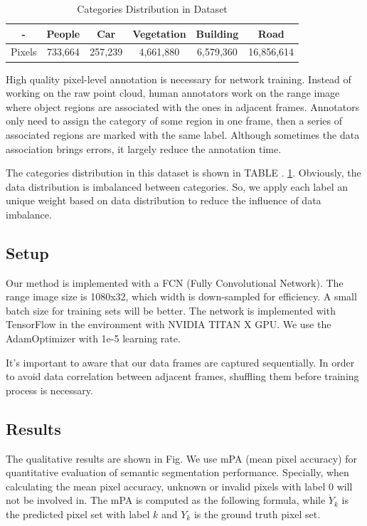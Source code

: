 \begin{table}[hb]
	\begin{center} \caption{Categories Distribution in Dataset}
		\label{category_distribution}
		\renewcommand{\arraystretch}{1.3}
		\begin{tabular}{|c|c|c|c|c|c|}
			\hline
			 - & People & Car & Vegetation & Building & Road	\\
			\hline
			Pixels & 733,664 & 257,239 & 4,661,880 & 6,579,360 & 16,856,614	\\
			\hline
		\end{tabular}
	\end{center}
\end{table}

High quality pixel-level annotation is necessary for network training. Instead of working on the raw point cloud, human annotators work on the range image where object regions are associated with the ones in adjacent frames. Annotators only need to assign the category of some region in one frame, then a series of associated regions are marked with the same label. Although sometimes the data association brings errors, it largely reduce the annotation time. 

The categories distribution in this dataset is shown in TABLE . \ref{category_distribution}. Obviously, the data distribution is imbalanced between categories. So, we apply each label an unique weight based on data distribution to reduce the influence of data imbalance.

\subsection{Setup}
Our method is implemented with a FCN (Fully Convolutional Network). The range image size is 1080x32, which width is down-sampled for efficiency. A small batch size for training sets will be better. The network is implemented with TensorFlow in the environment with NVIDIA TITAN X GPU. We use the AdamOptimizer with 1e-5 learning rate.

It's important to aware that our data frames are captured sequentially. In order to avoid data correlation between adjacent frames, shuffling them before training process is necessary.

\subsection{Results}
The qualitative results are shown in Fig. We use mPA (mean pixel accuracy) for quantitative evaluation of semantic segmentation performance. Specially, when calculating the mean pixel accuracy, unknown or invalid pixels with label 0 will not be involved in. The mPA is computed as the following formula, while $\dot{Y}_k$ is the predicted pixel set with label $k$ and $Y_k$ is the ground truth pixel set.


